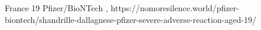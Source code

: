           {France}
          {19}
          {Pfizer/BioNTech}
          {}
          {
            , %
          }
          {https://nomoresilence.world/pfizer-biontech/shandrille-dallagnese-pfizer-severe-adverse-reaction-aged-19/}

